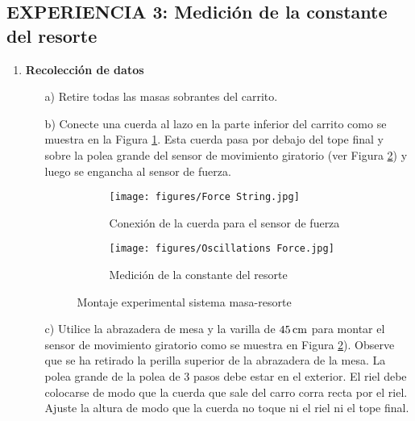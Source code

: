 \documentclass[9pt,a4paper,twocolumn,twoside]{tau-class/tau}
\begin{document}
\subsection{EXPERIENCIA 3: Medición  de  la  constante  del  resorte}
    \begin{enumerate}
        \item \textbf{Recolección de datos}
            \begin{itemize}
                \item [a)] Retire  todas  las  masas  sobrantes  del  carrito.
                \item [b)]  Conecte  una  cuerda  al  lazo  en  la  parte  inferior  del  carrito  como  se  muestra  en  la  Figura  \textcolor{blue}{\ref{fig:5a}}.  Esta  cuerda  pasa  por  debajo  del  tope  final  y  sobre  la  polea  grande  del  sensor  de  movimiento  giratorio  (ver  Figura  \textcolor{blue}{\ref{fig:5b}})  y  luego  se  engancha  al  sensor  de  fuerza.
                \begin{figure}[htbp]
                     \centering
                     \hfill
                     \begin{subfigure}[b]{0.42\linewidth}
                         \centering
                         \texttt{[image: figures/Force String.jpg]}
                         \caption{  Conexión  de  la  cuerda  para  el  sensor  de  fuerza}
                         \label{fig:5a}
                     \end{subfigure}
                     \begin{subfigure}[b]{0.42\linewidth}
                         \centering
                         \texttt{[image: figures/Oscillations Force.jpg]}
                         \caption{ Medición  de  la  constante  del  resorte}
                         \label{fig:5b}
                     \end{subfigure}
                    \caption{Montaje experimental sistema masa-resorte}
                    \label{fig:montaje_experimental_5}
                \end{figure}
                \item [c)]  Utilice  la  abrazadera  de  mesa  y  la  varilla  de  $45\,\rm  cm$  para  montar  el  sensor  de  movimiento  giratorio  como  se  muestra  en Figura \textcolor{blue}{\ref{fig:5b}}).  Observe  que  se  ha  retirado  la  perilla  superior  de  la  abrazadera  de  la  mesa.  La polea grande de la polea de 3 pasos debe estar en el exterior. El riel debe colocarse de modo que la cuerda que sale del carro corra recta por el riel. Ajuste la altura de modo que la cuerda no toque ni el riel ni el tope final.

\end{itemize}
\end{enumerate}
\end{document}
